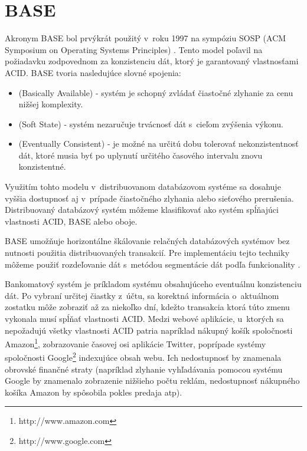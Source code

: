 \documentclass[11pt,twoside,a4paper]{book}
\begin{document}
\section{BASE} %
\label{section:base}
Akronym BASE bol prvýkrát použitý v~roku 1997 na sympóziu SOSP (ACM Symposium on Operating Systems Principles) \cite{fox1997cluster}. Tento model poľavil na požiadavku zodpovednom za konzistenciu dát, ktorý je garantovaný vlastnosťami ACID. BASE tvoria nasledujúce slovné spojenia: 
\begin{itemize}
  \item \emph{} (Basically Available) - systém je schopný zvládať čiastočné zlyhanie za cenu nižšej komplexity.
  \item \emph{} (Soft State) - systém nezaručuje trvácnosť dát s~cieľom zvýšenia výkonu. %
  \item \emph{} (Eventually Consistent) - je možné na určitú dobu tolerovať nekonzistentnosť dát, ktoré musia byť po uplynutí určitého časového intervalu znovu konzistentné.
\end{itemize}

Využitím tohto modelu v~distribuovanom databázovom systéme sa dosahuje vyššia dostupnosť 
aj v~prípade čiastočného zlyhania alebo sieťového prerušenia. Distribuovaný databázový systém môžeme klasifikovať ako systém spĺňajúci vlastnosti ACID, BASE alebo oboje.

BASE umožňuje horizontálne škálovanie relačných databázových systémov bez nutnosti použitia distribuovaných transakcií. Pre implementáciu tejto techniky môžeme použiť rozdeľovanie dát s~metódou segmentácie dát podľa funkcionality \cite{Pritchett:2008:BAA:1394127.1394128}.


Bankomatový systém je príkladom systému obsahujúceho eventuálnu konzistenciu dát. Po vybraní určitej čiastky z~účtu, sa korektná informácia o~aktuálnom zostatku môže zobraziť až za niekoľko dní, kdežto transakcia ktorá túto zmenu vykonala musí spĺňať vlastnosti ACID. Medzi webové aplikácie, u~ktorých sa nepožadujú všetky vlastnosti ACID patria napríklad nákupný košík spoločnosti Amazon\footnote{http://www.amazon.com}, zobrazovanie časovej osi aplikácie Twitter, poprípade systémy spoločnosti Google\footnote{http://www.google.com} indexujúce obsah webu. Ich nedostupnosť by znamenala obrovské finančné straty (napríklad zlyhanie vyhľadávania pomocou systému Google by znamenalo zobrazenie nižšieho počtu reklám, nedostupnosť nákupného košíka Amazon by spôsobila pokles predaja atp).
\end{document}
